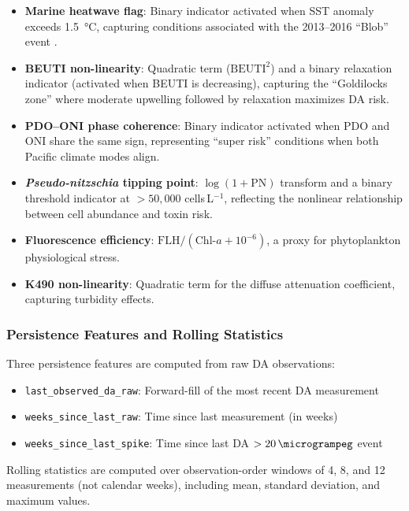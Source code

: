 \documentclass[preprint,12pt,authoryear]{elsarticle}
\begin{document}
\begin{itemize}[nosep]
    \item \textbf{Marine heatwave flag}: Binary indicator activated when SST anomaly exceeds \SI{1.5}{\degreeCelsius}, capturing conditions associated with the 2013--2016 ``Blob'' event \citep{Bond2015}.
    \item \textbf{BEUTI non-linearity}: Quadratic term ($\text{BEUTI}^2$) and a binary relaxation indicator (activated when BEUTI is decreasing), capturing the ``Goldilocks zone'' where moderate upwelling followed by relaxation maximizes DA risk.
    \item \textbf{PDO--ONI phase coherence}: Binary indicator activated when PDO and ONI share the same sign, representing ``super risk'' conditions when both Pacific climate modes align.
    \item \textbf{\textit{Pseudo-nitzschia} tipping point}: $\log(1 + \text{PN})$ transform and a binary threshold indicator at $> 50{,}000$ cells\,L$^{-1}$, reflecting the nonlinear relationship between cell abundance and toxin risk.
    \item \textbf{Fluorescence efficiency}: $\text{FLH} / (\text{Chl-}a + 10^{-6})$, a proxy for phytoplankton physiological stress.
    \item \textbf{K490 non-linearity}: Quadratic term for the diffuse attenuation coefficient, capturing turbidity effects.
\end{itemize}

\subsubsection{Persistence Features and Rolling Statistics}

Three persistence features are computed from raw DA observations:
\begin{itemize}[nosep]
    \item \texttt{last\_observed\_da\_raw}: Forward-fill of the most recent DA measurement
    \item \texttt{weeks\_since\_last\_raw}: Time since last measurement (in weeks)
    \item \texttt{weeks\_since\_last\_spike}: Time since last DA $> \SI{20}{\microgrampeg}$ event
\end{itemize}

Rolling statistics are computed over observation-order windows of 4, 8, and 12 measurements (not calendar weeks), including mean, standard deviation, and maximum values.
\end{document}
